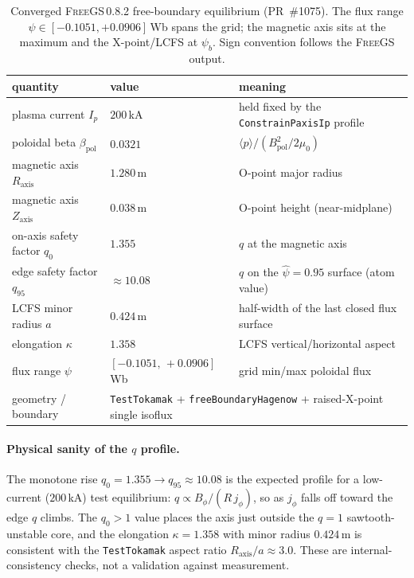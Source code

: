 \begin{table}[h]
\centering
\small
\begin{tabular}{@{}>{\raggedright\arraybackslash}m{4.6cm} l >{\raggedright\arraybackslash}m{5.8cm}@{}}
\toprule
\textbf{quantity} & \textbf{value} & \textbf{meaning} \\
\midrule
plasma current $I_p$              & $200$\,kA              & held fixed by the \texttt{ConstrainPaxisIp} profile \\
poloidal beta $\beta_{\text{pol}}$ & $0.0321$              & $\langle p\rangle / (B_{\text{pol}}^2/2\mu_0)$ \\
magnetic axis $R_{\text{axis}}$   & $1.280$\,m             & O-point major radius \\
magnetic axis $Z_{\text{axis}}$   & $0.038$\,m             & O-point height (near-midplane) \\
on-axis safety factor $q_0$       & $1.355$                & $q$ at the magnetic axis \\
edge safety factor $q_{95}$       & $\approx 10.08$        & $q$ on the $\hat\psi=0.95$ surface (atom value) \\
LCFS minor radius $a$             & $0.424$\,m             & half-width of the last closed flux surface \\
elongation $\kappa$               & $1.358$                & LCFS vertical/horizontal aspect \\
flux range $\psi$                 & $[-0.1051,\,+0.0906]$\,Wb & grid min/max poloidal flux \\
geometry / boundary               & \multicolumn{2}{l}{\texttt{TestTokamak} + \texttt{freeBoundaryHagenow} + raised-X-point single isoflux} \\
\bottomrule
\end{tabular}
\caption{Converged \textsc{FreeGS}\,0.8.2 free-boundary equilibrium
(PR~\#1075). The flux range $\psi\in[-0.1051,+0.0906]$\,Wb spans the
grid; the magnetic axis sits at the maximum and the X-point/LCFS at
$\psi_b$. Sign convention follows the \textsc{FreeGS} output.}
\label{tab:gs-output}
\end{table}

\paragraph{Physical sanity of the $q$ profile.}
The monotone rise $q_0=1.355 \to q_{95}\approx 10.08$ is the expected
profile for a low-current ($200$\,kA) test equilibrium: $q\propto B_\phi/
(R\, j_\phi)$, so as $j_\phi$ falls off toward the edge $q$ climbs. The
$q_0>1$ value places the axis just outside the $q\!=\!1$ sawtooth-unstable
core, and the elongation $\kappa=1.358$ with minor radius $0.424$\,m is
consistent with the \texttt{TestTokamak} aspect ratio
$R_{\text{axis}}/a\approx 3.0$. These are internal-consistency checks, not
a validation against measurement.

